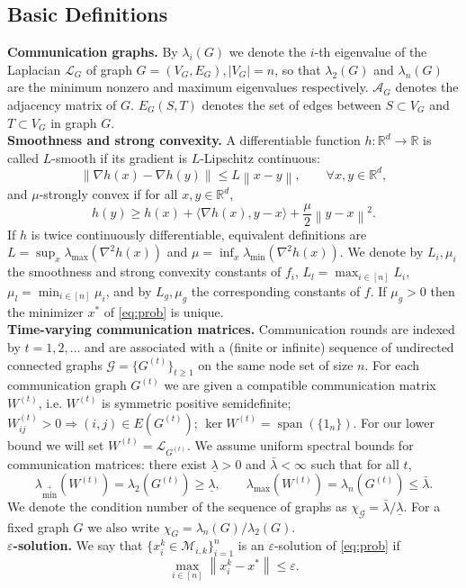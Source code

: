 \documentclass[a4paper,USenglish,cleveref, autoref, thm-restate]{lipics-v2021}
\newcommand{\eps}{\varepsilon}
\newcommand{\R}{{\mathbb R}}
\newcommand{\cG}{{\mathcal G}}
\newcommand{\cA}{{\mathcal A}}
\newcommand{\cL}{{\mathcal L}}
\newcommand{\norm}[1]{\left\|#1 \right\|}
\newcommand{\sqn}[1]{\norm{#1}^2}
\newcommand{\lmax}{\lambda_{\max}}
\newcommand{\lminp}{\lambda_{\min^+}}
\begin{document}
\subsection{Basic Definitions}\label{sec:defs}
\textbf{Communication graphs.} By $\lambda_i(G)$ we denote the $i$-th eigenvalue of the Laplacian $\cL_G$ of graph $G = (V_G, E_G), |V_G| = n$, so that $\lambda_2(G)$ and $\lambda_n(G)$ are the minimum nonzero and maximum eigenvalues respectively.
$\cA_G$ denotes the adjacency matrix of $G$.
$E_G(S, T)$ denotes the set of edges between $S \subset V_G$ and $T \subset V_G$ in graph $G$.
\\
\textbf{Smoothness and strong convexity.}
A differentiable function $h:\R^d\to \R$ is called $L$-smooth if its gradient is $L$-Lipschitz continuous:
\begin{equation}\label{eq:smooth}
  \norm{\nabla h(x)-\nabla h(y)} \le L \norm{x-y}, \qquad \forall x,y\in \R^d,
\end{equation}
and $\mu$-strongly convex if for all $x,y\in\R^d$,
\begin{equation}\label{eq:strongcvx}
  h(y)\ge h(x) + \langle \nabla h(x), y-x\rangle + \frac{\mu}{2}\sqn{y-x}.
\end{equation}
If $h$ is twice continuously differentiable, equivalent definitions are $L = \sup_x \lambda_{\max}(\nabla^2 h(x))$  and  $\mu = \inf_x \lambda_{\min}(\nabla^2 h(x))$.
We denote by $L_i,\mu_i$ the smoothness and strong convexity constants of $f_i$,
$L_l {=} \max_{i\in[n]}L_i$, $\mu_l {=} \min_{i\in[n]}\mu_i$, and by $L_g,\mu_g$ the corresponding constants of $f$.
If $\mu_g>0$ then the minimizer $x^*$ of \eqref{eq:prob} is unique.
\\
\textbf{Time-varying communication matrices.}
Communication rounds are indexed by $t=1,2,\ldots$ and are associated with a (finite or infinite) sequence of undirected connected graphs
$\cG=\{G^{(t)}\}_{t\ge 1}$ on the same node set of size $n$.
For each communication graph $G^{(t)}$ we are given a compatible communication matrix $W^{(t)}$, i.e.
$W^{(t)}$ is symmetric positive semidefinite; $W^{(t)}_{ij} > 0 \Rightarrow (i, j) \in E({G^{(t)}})$; $\ker W^{(t)} = \operatorname{span}(\{1_n\})$.
For our lower bound we will set $W^{(t)} {=} \cL_{G^{(t)}}$.
We assume uniform spectral bounds for communication matrices: there exist $\underline\lambda>0$ and $\bar\lambda<\infty$ such that for all $t$,
\begin{equation}\label{eq:uniform-spectrum}
  \lminp\!\left(W^{(t)}\right)=\lambda_2\!\left(G^{(t)}\right)\ge \underline\lambda,
  \qquad
  \lmax\!\left(W^{(t)}\right)=\lambda_n\!\left(G^{(t)}\right)\le \bar\lambda.
\end{equation}
We denote the condition number of the sequence of graphs as 
$\chi_\cG = \bar \lambda / \underline \lambda$.
For a fixed graph $G$ we also write $\chi_G {=} \lambda_n(G)/\lambda_2(G)$.
\\
\textbf{$\eps$-solution.}
We say that $\{x^k_i \in \mathcal M_{i, k}\}_{i=1}^n$ is an $\eps$-solution of \eqref{eq:prob} if
\begin{equation}\label{eq:eps-sol}
  \max_{i\in[n]} \norm{x_i^k-x^*}\le \eps.
\end{equation}
\end{document}
